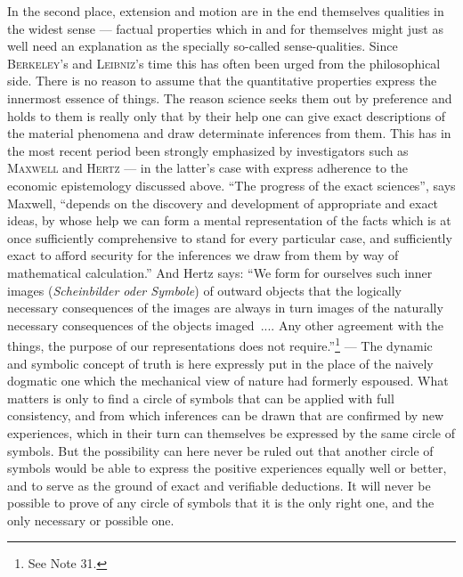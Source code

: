 \documentclass[12pt,a4paper]{book}
\newcommand{\opage}[1]{\marginnote{\footnotesize\textit{[#1]}}}
\begin{document}
In the second place, extension and motion are in the end themselves qualities in
the widest sense --- factual properties which in and for themselves might just
as well need an explanation as the specially so-called sense-qualities. Since
\textsc{Berkeley}'s and \textsc{Leibniz}'s time this has often been urged from
the philosophical side. There is no reason to assume that the quantitative
properties express the innermost essence of things. The reason science seeks
them out by preference and holds to them is really only that by their help one
can give exact descriptions of the material phenomena and draw determinate
inferences from them. This has in the most recent period been strongly
emphasized by investigators such as \textsc{Maxwell} and \textsc{Hertz} --- in
the latter's case with express adherence to the economic epistemology discussed
above. ``The progress of the exact sciences'', says Maxwell, ``depends on the
discovery and development of appropriate and exact ideas, by whose help we can
form a mental representation of the facts which is at once sufficiently
comprehensive to stand for every particular case, and sufficiently exact to
afford security for the inferences we draw from them by way of mathematical
calculation.'' And Hertz says: ``We form for ourselves such inner images
(\textit{Scheinbilder oder Symbole}) of outward objects that the logically
necessary consequences \opage{41}of the images are always in turn images of the naturally
necessary consequences of the objects imaged~.... Any other agreement with the
things, the purpose of our representations does not
require.''\footnote{See Note 31.} --- The dynamic and symbolic concept of truth
is here expressly put in the place of the naively dogmatic one which the
mechanical view of nature had formerly espoused. What matters is only to find a
circle of symbols that can be applied with full consistency, and from which
inferences can be drawn that are confirmed by new experiences, which in their
turn can themselves be expressed by the same circle of symbols. But the
possibility can here never be ruled out that another circle of symbols would be
able to express the positive experiences equally well or better, and to serve as
the ground of exact and verifiable deductions. It will never be possible to
prove of any circle of symbols that it is the only right one, and the only
necessary or possible one.
\end{document}
